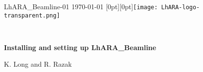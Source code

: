 \graphicspath{ {00-Top-matter/Figures/} }
\thispagestyle{empty}

\noindent LhARA\_Beamline-01 \hfill \today{} \hfill  \raisebox{-3.25mm}[0pt][0pt]{\texttt{[image: LhARA-logo-transparent.png]}}

\vspace{-0.25cm}
\noindent{\color{DarkYellow} \rule[0mm]{\textwidth}{0.43pt}}\\
\vspace{-0.50cm}
\begin{center}
  {\bf\LARGE\color{DarkBlue}
    Installing and setting up LhARA\_Beamline
  }
\end{center}
\vspace{-0.4cm}
\begin{center}
  K. Long and R. Razak
\end{center}
\vspace{-0.2cm}
